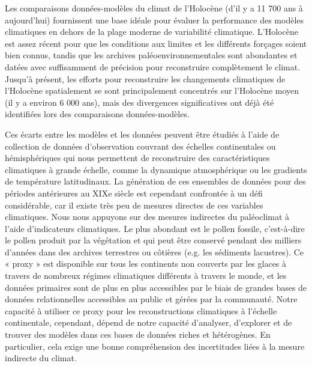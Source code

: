 \documentclass[
11pt, %
english, %
singlespacing, %
headsepline, %
]{MastersDoctoralThesis} %
\begin{document}
\begin{NoHyper}
\renewcommand{\abstractname}{Résumé}
\renewcommand{\univname}{\href{https://www.unil.ch}{Université de Lausanne}}
\renewcommand{\facname}{\href{https://www.unil.ch/gse}{Faculté des géosciences et de l'environnement}}
\renewcommand{\deptname}{\href{https://www.unil.ch/idyst/}{Institut des dynamiques de la surface terrestre}}
\renewcommand{\degreename}{Docteur ès Sciences}
\begin{thesisabstract}[]
\addchaptertocentry{\abstractname}
Les comparaisons données-modèles du climat de l'Holocène (d’il y a 11 700 ans à aujourd'hui) fournissent une base idéale pour évaluer la performance des modèles climatiques en dehors de la plage moderne de variabilité climatique. L'Holocène est assez récent pour que les conditions aux limites et les différents forçages soient bien connus, tandis que les archives paléoenvironnementales sont abondantes et datées avec suffisamment de précision pour reconstruire complètement le climat. Jusqu'à présent, les efforts pour reconstruire les changements climatiques de l'Holocène spatialement se sont principalement concentrés sur l'Holocène moyen (il y a environ 6 000 ans), mais des divergences significatives ont déjà été identifiées lors des comparaisons données-modèles.

Ces écarts entre les modèles et les données peuvent être étudiés à l'aide de collection de données d'observation couvrant des échelles continentales ou hémisphériques qui nous permettent de reconstruire des caractéristiques climatiques à grande échelle, comme la dynamique atmosphérique ou les gradients de température latitudinaux. La génération de ces ensembles de données pour des périodes antérieures au XIXe siècle est cependant confrontée à un défi considérable, car il existe très peu de mesures directes de ces variables climatiques. Nous nous appuyons sur des mesures indirectes du paléoclimat à l'aide d'indicateurs climatiques. Le plus abondant est le pollen fossile, c'est-à-dire le pollen produit par la végétation et qui peut être conservé pendant des milliers d'années dans des archives terrestres ou côtières (e.g. les sédiments lacustres). Ce « proxy » est disponible sur tous les continents non couverts par les glaces à travers de nombreux régimes climatiques différents à travers le monde, et les données primaires sont de plus en plus accessibles par le biais de grandes bases de données relationnelles accessibles au public et gérées par la communauté. Notre capacité à utiliser ce proxy pour les reconstructions climatiques à l'échelle continentale, cependant, dépend de notre capacité d'analyser, d'explorer et de trouver des modèles dans ces bases de données riches et hétérogènes. En particulier, cela exige une bonne compréhension des incertitudes liées à la mesure indirecte du climat.


\end{thesisabstract}
\end{NoHyper}
\end{document}
